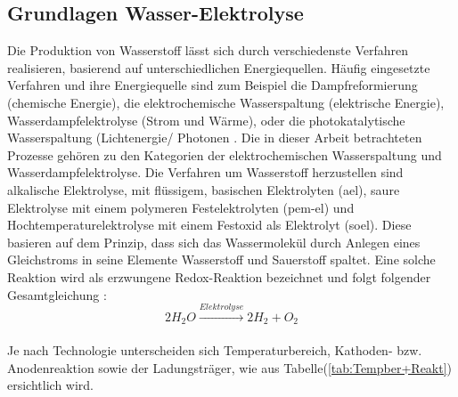\documentclass[onecolumn,10pt,titlepage]{article}
\begin{document}
%

\subsection{Grundlagen Wasser-Elektrolyse}
\label{subs_Grundl_EL}

Die Produktion von Wasserstoff lässt sich durch verschiedenste Verfahren realisieren, basierend auf unterschiedlichen Energiequellen. Häufig eingesetzte Verfahren und ihre Energiequelle sind zum Beispiel die Dampfreformierung (chemische Energie), die elektrochemische Wasserspaltung (elektrische Energie), Wasserdampfelektrolyse (Strom und Wärme), oder die photokatalytische Wasserspaltung (Lichtenergie/ Photonen \cite{Schnurnberge.2004}. Die in dieser Arbeit betrachteten Prozesse gehören zu den Kategorien der elektrochemischen Wasserspaltung und Wasserdampfelektrolyse. Die Verfahren um Wasserstoff herzustellen sind alkalische Elektrolyse, mit flüssigem, basischen Elektrolyten (\gls{ael}), saure Elektrolyse mit einem polymeren Festelektrolyten (\gls{pem}-\gls{el}) und Hochtemperaturelektrolyse mit einem Festoxid als Elektrolyt (\gls{soel}).\cite{Smolinka.05.07.2011} Diese basieren auf dem Prinzip, dass sich das Wassermolekül durch Anlegen eines Gleichstroms in seine Elemente Wasserstoff und Sauerstoff spaltet. Eine solche Reaktion wird als erzwungene Redox-Reaktion bezeichnet und folgt folgender Gesamtgleichung \cite{Ghaib.2017}:
\\
\begin{equation}
2H_2O \xrightarrow{Elektrolyse} 2H_2+O_2
\label{eq:EL_REakt}
\end{equation}
\\
Je nach Technologie unterscheiden sich Temperaturbereich, Kathoden- bzw. Anodenreaktion sowie der Ladungsträger, wie aus Tabelle(\ref{tab:Tempber+Reakt}) ersichtlich wird.
\end{document}
